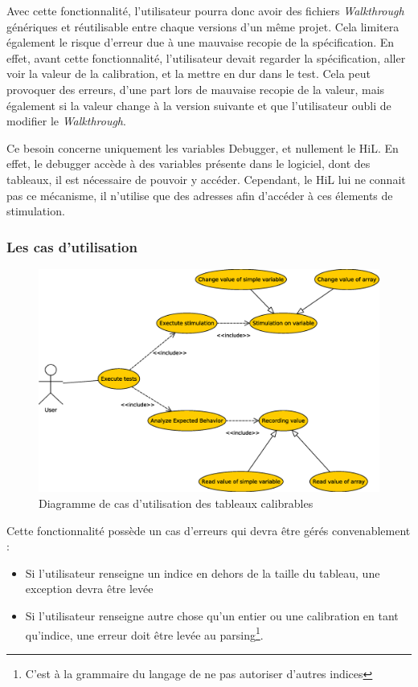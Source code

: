 Avec cette fonctionnalité, l'utilisateur pourra donc avoir des fichiers \textit{Walkthrough} génériques et réutilisable entre chaque versions d'un même projet. Cela limitera également le risque d'erreur due à une mauvaise recopie de la spécification. En effet, avant cette fonctionnalité, l'utilisateur devait regarder la spécification, aller voir la valeur de la calibration, et la mettre en dur dans le test. Cela peut provoquer des erreurs, d'une part lors de mauvaise recopie de la valeur, mais également si la valeur change à la version suivante et que l'utilisateur oubli de modifier le \textit{Walkthrough}.

Ce besoin concerne uniquement les variables Debugger, et nullement le HiL. En effet, le debugger accède à des variables présente dans le logiciel, dont des tableaux, il est nécessaire de pouvoir y accéder. Cependant, le HiL lui ne connait pas ce mécanisme, il n'utilise que des adresses afin d'accéder à ces élements de stimulation.

\subsubsection{Les cas d'utilisation}
\begin{figure}[H]
\centering
\includegraphics[width=18cm]{contents/images/usecasearray.eps}
\caption{Diagramme de cas d'utilisation des tableaux calibrables}
\end{figure}
\begin{remarque}
Cette fonctionnalité possède un cas d'erreurs qui devra être gérés convenablement : 
\begin{itemize}
\item Si l'utilisateur renseigne un indice en dehors de la taille du tableau, une exception devra être levée
\item Si l'utilisateur renseigne autre chose qu'un entier ou une calibration en tant qu'indice, une erreur doit être levée au parsing\footnote{C'est à la grammaire du langage de ne pas autoriser d'autres indices}.
 \end{itemize}
 \end{remarque}
 
